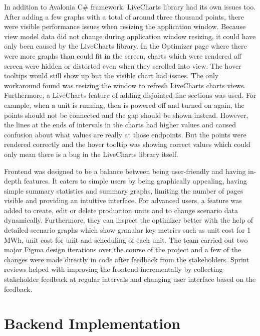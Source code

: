 In addition to Avalonia C\# framework, LiveCharts library had its own issues too. After adding a few graphs with a total of around three thousand points, there were visible performance issues when resizing the application window. Because view model data did not change during application window resizing, it could have only been caused by the LiveCharts library. In the Optimizer page where there were more graphs than could fit in the screen, charts which were rendered off screen were hidden or distorted even when they scrolled into view. The hover tooltips would still show up but the visible chart had issues. The only workaround found was resizing the window to refresh LiveCharts charts views. Furthermore, a LiveCharts feature of adding disjointed line sections was used. For example, when a unit is running, then is powered off and turned on again, the points should not be connected and the gap should be shown instead. However, the lines at the ends of intervals in the charts had higher values and caused confusion about what values are really at those endpoints. But the points were rendered correctly and the hover tooltip was showing correct values which could only mean there is a bug in the LiveCharts library itself.\par
Frontend was designed to be a balance between being user-friendly and having in-depth features. It caters to simple users by being graphically appealing, having simple summary statistics and summary graphs, limiting the number of pages visible and providing an intuitive interface. For advanced users, a feature was added to create, edit or delete production units and to change scenario data dynamically. Furthermore, they can inspect the optimizer better with the help of detailed scenario graphs which show granular key metrics such as unit cost for 1 MWh, unit cost for unit and scheduling of each unit. The team carried out two major Figma design iterations over the course of the project and a few of the changes were made directly in code after feedback from the stakeholders. Sprint reviews helped with improving the frontend incrementally by collecting stakeholder feedback at regular intervals and changing user interface based on the feedback.

\section{Backend Implementation}

